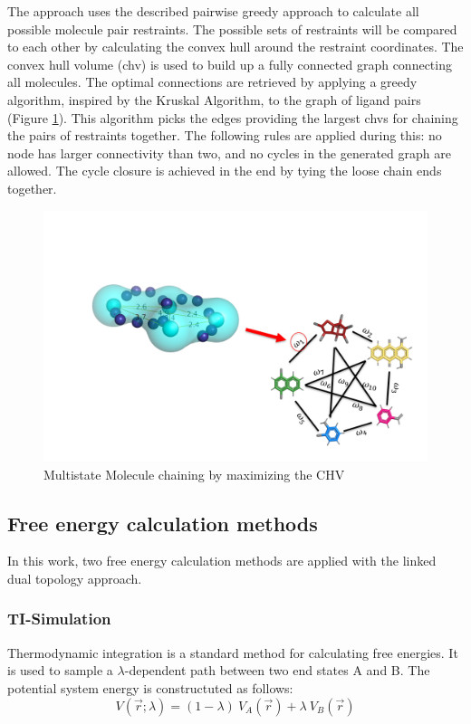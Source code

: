 The approach uses the described pairwise greedy approach to calculate all possible molecule pair restraints. The possible sets of restraints will be compared to each other by calculating the convex hull around the restraint coordinates. The convex hull volume (chv) is used to build up a fully connected graph connecting all molecules. The optimal connections are retrieved by applying a greedy algorithm, inspired by the Kruskal Algorithm, to the graph of ligand pairs (Figure \ref{fig: convexHull}). This algorithm picks the edges providing the largest chvs for chaining the pairs of restraints together. The following rules are applied during this: no node has larger connectivity than two, and no cycles in the generated graph are allowed. The cycle closure is achieved in the end by tying the loose chain ends together.

\begin{figure}[h]
    \centering
    \includegraphics[width=\textwidth]{fig/theory/MultistateChainingScheme.png}
    \caption{Multistate Molecule chaining by maximizing the CHV}
    \label{fig: convexHull}
\end{figure}

\subsection{Free energy calculation methods}
In this work, two free energy calculation methods are applied with the linked dual topology approach.

\subsubsection{TI-Simulation}
Thermodynamic integration is a standard method for calculating free energies. It is used to sample a $\lambda$-dependent path between two end states A and B. The potential system energy is constructuted as follows:\cite{Kirkwood1935}
\begin{equation}
    V(\vec{r}; \lambda) = (1-\lambda) ~ V_A(\vec{r}) + \lambda ~ V_B(\vec{r})
    \label{eq: TI-Potential}
\end{equation}


